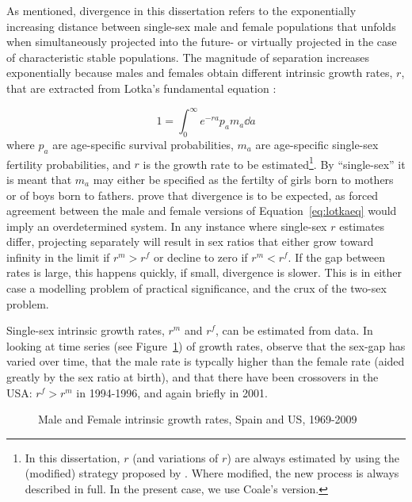  \FloatBarrier
 \label{sex:divlotkar}
As mentioned, divergence in this dissertation refers to the exponentially
increasing distance between single-sex male and female populations that unfolds
when simultaneously projected into the future- or virtually projected in the
case of characteristic stable populations. The magnitude of separation increases
exponentially because males and females obtain different intrinsic 
growth rates, $r$, that are extracted from Lotka's fundamental equation
\citep{sharpe1911problem}:

\begin{equation}
\label{eq:lotkaeq}
1 = \int _0 ^\infty e^{-ra}p_a m_a \dd a 
\end{equation}
where $p_a$ are age-specific survival probabilities, $m_a$ are age-specific
single-sex fertility probabilities, and $r$ is the growth rate to be
estimated\footnote{In this dissertation, $r$ (and variations of $r$) are always
estimated by using the (modified) strategy proposed by \citet{coale1957new}.
Where modified, the new process is always described in full. In the present
case, we use Coale's version.}. By ``single-sex'' it is meant that $m_a$ may
either be specified as the fertilty of girls born to mothers or of boys born to fathers. \citet{yellin1977comparison} prove that divergence is to be expected, as forced agreement between the male and female versions of Equation~\eqref{eq:lotkaeq} would imply an overdetermined system. 
In any instance
where single-sex $r$ estimates differ, projecting separately will result in sex
ratios that either grow toward infinity in the limit if $r^m
> r^f$ or decline to zero if $r^m < r^f$. If the gap between rates is large, this happens
quickly, if small, divergence is slower. This is in either case a modelling
problem of practical significance, and the crux of the two-sex problem. 

Single-sex intrinsic growth rates, $r^m$ and $r^f$, can be 
estimated from data. In looking at time series (see Figure~\ref{fig:rmf}) of 
 growth rates, observe that the sex-gap has varied over 
time, that the male rate is typcally higher than the female rate (aided greatly 
by the sex ratio at birth), and that there have been crossovers in the USA: 
$r^f > r^m$ in 1994-1996, and again briefly in 2001. 

\begin{figure}[ht!]
        \centering  
          \caption{Male and Female intrinsic growth rates, Spain and US,
          1969-2009}
          \label{fig:rmf}
\end{figure}

